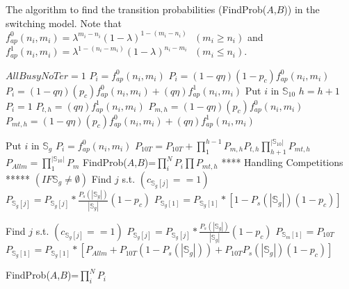 \documentclass[12pt,journal,oneside,onecolumn]{IEEEtran}
\begin{document}
\begin{algorithm}
\caption{\scriptsize{The algorithm to find the transition probabilities (FindProb($A$,$B$)) in the switching model. Note that $f^0_{ap}(n_i,m_i)=\lambda^{m_i-n_i} (1-\lambda)^{1-(m_i-n_i)} \mbox{ } (m_i \geq n_i)$ and $f^1_{ap}(n_i,m_i)=\lambda^{1-(n_i-m_i)} (1-\lambda)^{n_i-m_i} \mbox{ } (m_i \leq n_i)$.}
\label{alg-queue-occ-switching}}
\tiny
\begin{algorithmic}
\STATE $AllBusyNoTer=1$
\ENDIF
{}
    \STATE $P_i=f^0_{ap}(n_i,m_i)$
\ELSE
    					\STATE $P_i=(1-q\eta)(1-p_c)f^0_{ap}(n_i,m_i)$
					 \ELSE
    								\STATE $P_i=(1-q\eta)(p_c)f^0_{ap}(n_i,m_i)+(q\eta)f^1_{ap}(n_i,m_i)$
    						\ELSE
             			  \STATE Put $i$ in $\mathbb{S}_{10}$
             			  \STATE $h=h+1$
    								\STATE $P_i=1$
    								\STATE $P_{t,h}=(q\eta)f^1_{ap}(n_i,m_i)$
    								\STATE $P_{m,h}=(1-q\eta)(p_c)f^0_{ap}(n_i,m_i)$
    								\STATE $P_{mt,h}=(1-q\eta)(p_c)f^0_{ap}(n_i,m_i)+(q\eta)f^1_{ap}(n_i,m_i)$
    						\ENDIF
					 					
    			 \ENDIF
\ELSE
    			 \STATE Put $i$ in $\mathbb{S}_g$
    			 \STATE $P_i=f^0_{ap}(n_i,m_i)$
    \ENDIF
\ENDIF
\ENDFOR
{}
 \STATE $P_{10T}=P_{10T}+ \prod_{1}^{h-1}{P_{m,h}} P_{t,h} \prod_{h+1}^{|\mathbb{S}_{10}|}{P_{mt,h}}$
\ENDFOR
 \STATE $P_{Allm}=\prod_{1}^{|\mathbb{S}_{10}|}{P_{m}}$
\STATE FindProb($A$,$B$)=$\prod_{i}^{N}{P_i} \prod{P_{mt,h}}$
\STATE ***** Handling Competitions ***** $(IF \mathbb{S}_g \neq \emptyset)$
		\STATE Find $j$ s.t.  $(c_{\mathbb{S}_g[j]}==1)$
    	  \STATE $P_{\mathbb{S}_g[j]}=P_{\mathbb{S}_g[j]}* \frac{P_s(|\mathbb{S}_g|)}{|\mathbb{S}_g|}(1-p_c)$
    \ELSE
							\STATE $P_{\mathbb{S}_g[1]}=P_{\mathbb{S}_g[1]}* [1-P_s(|\mathbb{S}_g|)(1-p_c)]$
				\ENDIF
				
    \ENDIF

\ELSE
		\STATE Find $j$ s.t.  $(c_{\mathbb{S}_g[j]}==1)$
    	  \STATE $P_{\mathbb{S}_g[j]}=P_{\mathbb{S}_g[j]}* \frac{P_s(|\mathbb{S}_g|)}{|\mathbb{S}_g|}(1-p_c)$
    	  \STATE $P_{\mathbb{S}_m[1]}=P_{10T}$
    \ELSE
							\STATE $P_{\mathbb{S}_g[1]}=P_{\mathbb{S}_g[1]}* [P_{Allm}+P_{10T}(1-P_s(|\mathbb{S}_g|))+P_{10T}P_s(|\mathbb{S}_g|)(1-p_c)]$
				\ENDIF
				
    \ENDIF
\ENDIF

\STATE FindProb($A$,$B$)=$\prod_{i}^{N}{P_i}$
\end{algorithmic}
\end{algorithm}
\normalsize
\end{document}
